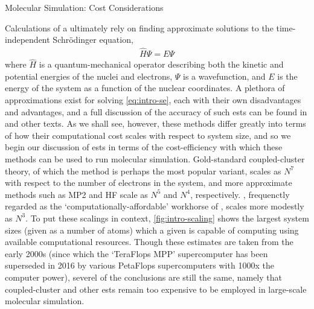 \begin{section}{Molecular Simulation: Cost Considerations}

Calculations of a \pes ultimately rely on finding approximate solutions to
the time-independent Schr\"odinger equation,
\begin{align}
\label{eq:intro-se}
\hat{H}\Psi = E\Psi
\end{align}
where $\hat{H}$ is a quantum-mechanical operator describing both the kinetic
and potential energies of the nuclei and electrons, $\Psi$ is a wavefunction,
and $E$ is the energy of the system as a function of the nuclear coordinates. A plethora of
approximations exist for solving \cref{eq:intro-se}, each with their own
disadvantages and advantages, and a full discussion of the accuracy of such
\glspl{est} can be found in \citet{Cramer2004} and other texts.
As we shall see, however, these methods differ greatly into terms of
how their computational cost scales with respect to system size, and so we begin our
discussion of \glspl{est} in terms of the cost-efficiency with which these
methods can be used to run molecular simulation.
%
Gold-standard coupled-cluster
theory, of which the \ccsdt method is perhaps the most popular variant, scales as $N^7$
with respect to the number of electrons in the system, and more approximate methods such as
MP2 and HF scale as $N^5$ and $N^4$, respectively. \dft, frequenctly regarded
as the 
`computationally-affordable' workhorse of \est, scales more modestly as $N^3$.
To put these scalings in context,
\cref{fig:intro-scaling} shows the largest system sizes (given as a number of
atoms) which a given \est is capable of computing using available
computational resources. 
Though these estimates are taken from the early 2000s (since which
the `TeraFlops MPP' supercomputer has been superseded in 2016 by
various PetaFlops supercomputers with 1000x the computer power), severel of
the conclusions are still the same, namely that coupled-cluster and other
\glspl{est} remain too expensive to be employed in large-scale molecular
simulation.


\end{section}
